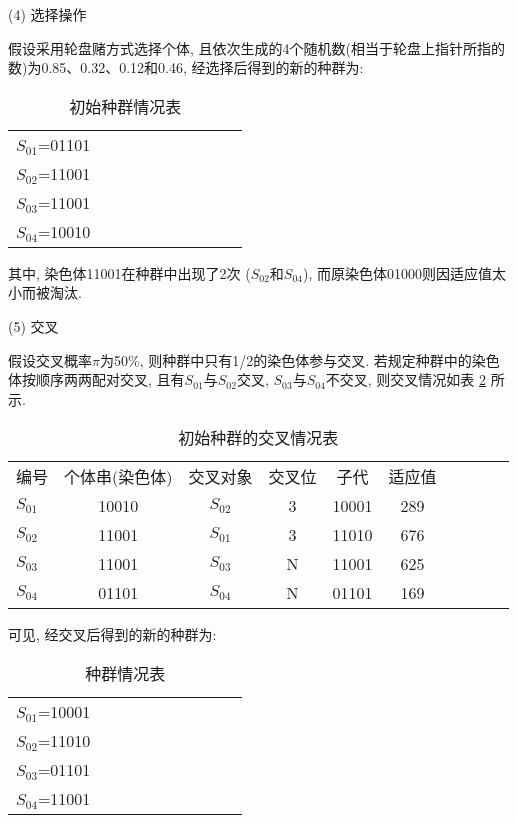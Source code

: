 (4) 选择操作

假设采用轮盘赌方式选择个体, 且依次生成的4个随机数(相当于轮盘上指针所指的数)为0.85、0.32、0.12和0.46, 经选择后得到的新的种群为:
\begin{table} [H]
\caption{初始种群情况表}
\vspace{-0.6cm}
\begin{center}
\begin{tabular} {lccccccccc}
\hline
    $S_{01}$=01101\\
    $S_{02}$=11001\\
    $S_{03}$=11001\\
    $S_{04}$=10010\\
\hline
\end{tabular}
\end{center}
\label{AI_table2019112803}\vspace{-0.4cm}
\end{table}
其中, 染色体11001在种群中出现了2次 ($S_{02}$和$S_{04}$), 而原染色体01000则因适应值太小而被淘汰.

(5) 交叉

假设交叉概率$\pi$为50\%, 则种群中只有1/2的染色体参与交叉.
若规定种群中的染色体按顺序两两配对交叉, 且有$S_{01}$与$S_{02}$交叉, $S_{03}$与$S_{04}$不交叉, 则交叉情况如表 \ref{AI_table2019112804} 所示.

\begin{table} [H]
\caption{初始种群的交叉情况表}
\vspace{-0.6cm}
\begin{center}
\begin{tabular} {lccccccccc}
  \hline
编号&	个体串(染色体)&	交叉对象	&交叉位&	  子代	& 适应值\\
$S_{01}$	&10010&	$S_{02}$&	3	&10001	&289\\
$S_{02}$	&11001&	$S_{01}$&	3	&11010	&676\\
$S_{03}$	&11001&	$S_{03}$&	N	&11001	&625\\
$S_{04}$	&01101&	$S_{04}$&	N	&01101	&169\\
\hline
\end{tabular}
\end{center}
\label{AI_table2019112804}\vspace{-0.4cm}
\end{table}

可见, 经交叉后得到的新的种群为:
\begin{table} [H]
\caption{种群情况表}
\vspace{-0.6cm}
\begin{center}
\begin{tabular} {lccccccccc}
\hline
    $S_{01}$=10001\\
    $S_{02}$=11010\\
    $S_{03}$=01101\\
    $S_{04}$=11001\\
\hline
\end{tabular}
\end{center}\vspace{-0.4cm}
\end{table}

